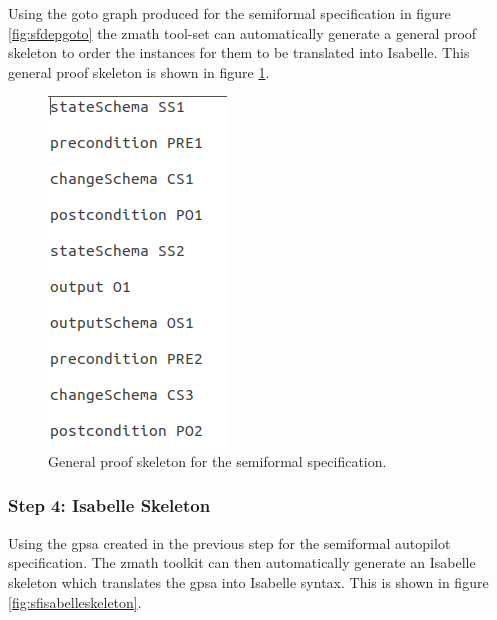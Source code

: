  Using the goto graph produced for the semiformal specification in figure
 \ref{fig:sfdepgoto} the \gls{zmath} tool-set can automatically generate a
 general proof skeleton to order the instances for them to be translated into
 Isabelle. This general proof skeleton is shown in figure \ref{fig:sfgpsa}.

 \begin{figure}[H]
 \centering
 \includegraphics[scale=0.5]{Figures/fullexample/sfgpsa.png}
 \caption{General proof skeleton for the semiformal specification. \label{fig:sfgpsa}}
 \end{figure}

 \subsubsection{Step 4: Isabelle Skeleton}

 Using the \gls{gpsa} created in the previous step for the semiformal autopilot
 specification. The \gls{zmath} toolkit can then automatically generate an
 Isabelle skeleton which translates the \gls{gpsa} into Isabelle syntax. This is
 shown in figure \ref{fig:sfisabelleskeleton}.

